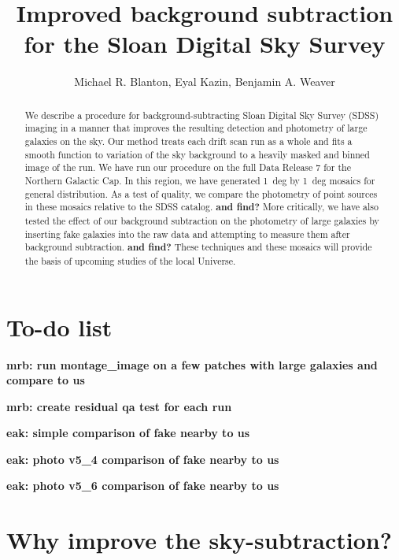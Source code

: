 \documentclass[10pt,preprint]{aastex}
\newcounter{address}
\begin{document}
\title{Improved background subtraction for the Sloan Digital Sky Survey}


\author{
Michael R. Blanton\altaffilmark{\ref{NYU}},
Eyal Kazin\altaffilmark{\ref{NYU}},
Benjamin A. Weaver\altaffilmark{\ref{NYU}}
}

\setcounter{address}{1}

\begin{abstract}
We describe a procedure for background-subtracting Sloan Digital Sky
Survey (SDSS) imaging in a manner that improves the resulting
detection and photometry of large galaxies on the sky. Our method
treats each drift scan run as a whole and fits a smooth function to
variation of the sky background to a heavily masked and binned image
of the run. We have run our procedure on the full Data Release 7 for
the Northern Galactic Cap. In this region, we have generated 1~deg by
1~deg mosaics for general distribution. As a test of quality, we
compare the photometry of point sources in these mosaics relative to
the SDSS catalog. {\bf and find?} More critically, we have also tested
the effect of our background subtraction on the photometry of large
galaxies by inserting fake galaxies into the raw data and attempting
to measure them after background subtraction. {\bf and find?} These
techniques and these mosaics will provide the basis of upcoming
studies of the local Universe.
\end{abstract}

\section{ To-do list}

{\bf mrb: run montage\_image on a few patches with large galaxies and
compare to us}

{\bf mrb: create residual qa test for each run}

{\bf eak: simple comparison of fake nearby to us}

{\bf eak: photo v5\_4 comparison of fake nearby to us}

{\bf eak: photo v5\_6 comparison of fake nearby to us}

\section{Why improve the sky-subtraction?}
\label{sec:intro}
\end{document}
